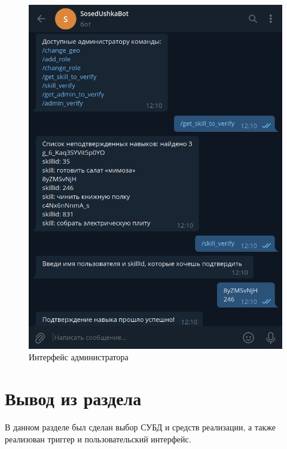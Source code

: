 \begin{figure}[H]
	\begin{center}
		\includegraphics[scale=0.3]{assets/administrator.png}
	\end{center}
	\caption{Интерфейс администратора}
	\label{administrator}
\end{figure}

\section{Вывод из раздела}

В данном разделе был сделан выбор СУБД и средств реализации, а также реализован триггер и пользовательский интерфейс.